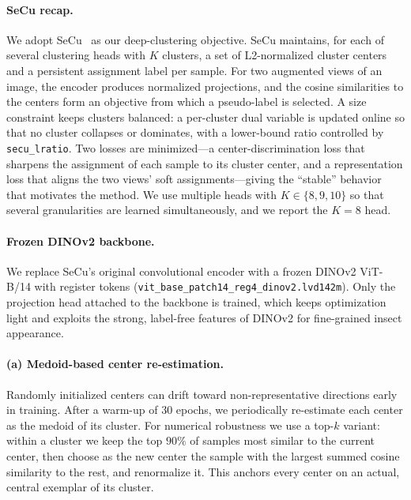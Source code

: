 \documentclass[10pt,a4paper,twocolumn]{article}
\begin{document}
\paragraph{SeCu recap.}
We adopt SeCu~\cite{qian2023secu} as our deep-clustering objective. SeCu maintains, for each of several clustering heads with $K$ clusters, a set of L2-normalized cluster centers and a persistent assignment label per sample. For two augmented views of an image, the encoder produces normalized projections, and the cosine similarities to the centers form an objective from which a pseudo-label is selected. A size constraint keeps clusters balanced: a per-cluster dual variable is updated online so that no cluster collapses or dominates, with a lower-bound ratio controlled by \texttt{secu\_lratio}. Two losses are minimized---a center-discrimination loss that sharpens the assignment of each sample to its cluster center, and a representation loss that aligns the two views' soft assignments---giving the ``stable'' behavior that motivates the method. We use multiple heads with $K\!\in\!\{8,9,10\}$ so that several granularities are learned simultaneously, and we report the $K\!=\!8$ head.

\paragraph{Frozen DINOv2 backbone.}
We replace SeCu's original convolutional encoder with a frozen DINOv2 ViT-B/14 with register tokens (\texttt{vit\_base\_patch14\_reg4\_dinov2.lvd142m}). Only the projection head attached to the backbone is trained, which keeps optimization light and exploits the strong, label-free features of DINOv2 for fine-grained insect appearance.

\paragraph{(a) Medoid-based center re-estimation.}
Randomly initialized centers can drift toward non-representative directions early in training. After a warm-up of $30$ epochs, we periodically re-estimate each center as the medoid of its cluster. For numerical robustness we use a top-$k$ variant: within a cluster we keep the top $90\%$ of samples most similar to the current center, then choose as the new center the sample with the largest summed cosine similarity to the rest, and renormalize it. This anchors every center on an actual, central exemplar of its cluster.
\end{document}
